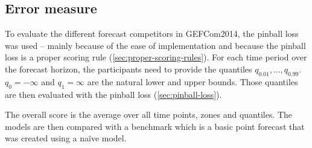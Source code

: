 \subsection{Error measure}

To evaluate the different forecast competitors in GEFCom2014, 
the pinball loss was used -- mainly because of the ease of implementation 
and because the pinball loss is a proper scoring rule (\ref{sec:proper-scoring-rules}).
For each time period over the forecast horizon, the participants need to 
provide the quantiles \(q_{0.01}, \ldots, q_{0.99}\). 
\(q_0 = -\infty\) and \(q_1 = \infty\) are the natural lower and upper bounds. 
Those quantiles are then evaluated with the pinball loss (\ref{sec:pinball-loss}).

The overall score is the average over all time points, zones and quantiles.
The models are then compared with a benchmark which is a basic point forecast 
that was created using a na\"{i}ve model.